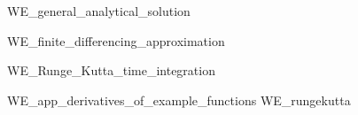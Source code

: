 \documentclass[a4paper,headsepline,12pt,oneside]{scrartcl}
\begin{document}


\newpage
\setcounter{page}{0}
\tableofcontents
\clearpage
\setcounter{page}{1}

{WE_general_analytical_solution}

\clearpage

{WE_finite_differencing_approximation}


\clearpage

\clearpage
{WE_Runge_Kutta_time_integration}

\clearpage
\clearpage
\appendix
{WE_app_derivatives_of_example_functions}
{WE_rungekutta}
\end{document}
